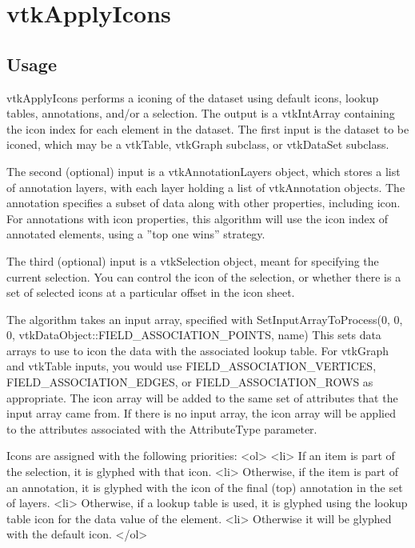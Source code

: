 \section{vtkApplyIcons}

\subsection{Usage}

 vtkApplyIcons performs a iconing of the dataset using default icons,
 lookup tables, annotations, and/or a selection. The output is a
 vtkIntArray containing the icon index for each
 element in the dataset. The first input is the dataset to be iconed, which
 may be a vtkTable, vtkGraph subclass, or vtkDataSet subclass.

 The second (optional) input is a vtkAnnotationLayers object, which stores
 a list of annotation layers, with each layer holding a list of
 vtkAnnotation objects. The annotation specifies a subset of data along with
 other properties, including icon. For annotations with icon properties,
 this algorithm will use the icon index of annotated elements,
 using a ''top one wins'' strategy.

 The third (optional) input is a vtkSelection object, meant for specifying
 the current selection. You can control the icon of the selection, or whether
 there is a set of selected icons at a particular offset in the icon sheet.

 The algorithm takes an input array, specified with
 SetInputArrayToProcess(0, 0, 0, vtkDataObject::FIELD\_ASSOCIATION\_POINTS, name)
 This sets data arrays to use to icon the data with
 the associated lookup table. For vtkGraph and vtkTable inputs, you would use
 FIELD\_ASSOCIATION\_VERTICES, FIELD\_ASSOCIATION\_EDGES, or
 FIELD\_ASSOCIATION\_ROWS as appropriate. The icon array will be added to the same
 set of attributes that the input array came from. If there is no input array,
 the icon array will be applied to the attributes associated with the
 AttributeType parameter.

 Icons are assigned with the following priorities:
 <ol>
 <li> If an item is part of the selection, it is glyphed with that icon.
 <li> Otherwise, if the item is part of an annotation, it is glyphed
      with the icon of the final (top) annotation in the set of layers.
 <li> Otherwise, if a lookup table is used, it is glyphed using the
      lookup table icon for the data value of the element.
 <li> Otherwise it will be glyphed with the default icon.
 </ol>

